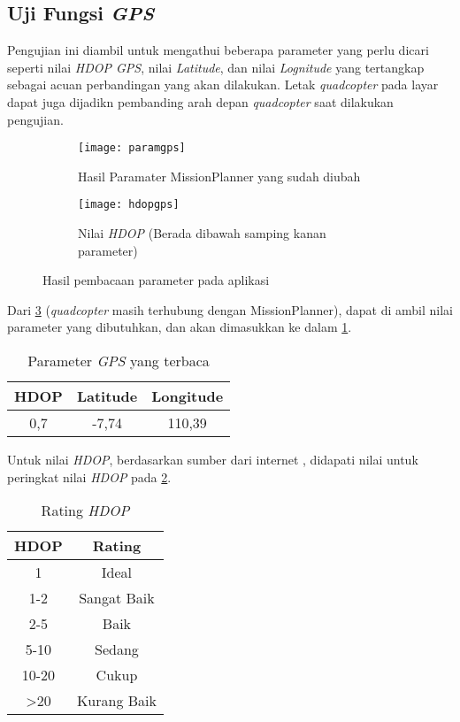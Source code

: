 \subsection{Uji Fungsi \textit{GPS}}
Pengujian ini diambil untuk mengathui beberapa parameter yang perlu dicari seperti nilai \textit{HDOP GPS}, nilai \textit{Latitude}, dan nilai \textit{Lognitude} yang tertangkap sebagai acuan perbandingan yang akan dilakukan. Letak \textit{quadcopter} pada layar dapat juga dijadikn pembanding arah depan \textit{quadcopter} saat dilakukan pengujian.

\begin{figure}[H]
	\centering
	\begin{subfigure}[b]{1\textwidth}
		\centering
		\texttt{[image: paramgps]}
		\caption{Hasil Paramater MissionPlanner yang sudah diubah}
		\label{fig:paramgps}
	\end{subfigure}
	\hfill
	\begin{subfigure}[b]{1\textwidth}
		\centering
		\texttt{[image: hdopgps]}
		\caption{Nilai \textit{HDOP} (Berada dibawah samping kanan parameter)}
		\label{fig:hdopgps}
	\end{subfigure}
	\caption{Hasil pembacaan parameter pada aplikasi}
	\label{fig:gpsonmissionplanner}
\end{figure}

Dari \cref{fig:gpsonmissionplanner} (\textit{quadcopter} masih terhubung dengan MissionPlanner), dapat di ambil nilai parameter yang dibutuhkan, dan akan dimasukkan ke dalam \cref{tab:gpsparam}.

\begin{table}[h]
	\caption{Parameter \textit{GPS} yang terbaca}
	\label{tab:gpsparam}
	\centering
	\begin{tabular}{|c|c|c|}
		\hline
		\textbf{HDOP} & \textbf{Latitude} & \textbf{Longitude} \\ \hline
		0,7  & -7,74    & 110,39    \\ \hline
	\end{tabular}
\end{table}

Untuk nilai \textit{HDOP}, berdasarkan sumber dari internet \citep{dop}, didapati nilai untuk peringkat nilai \textit{HDOP} pada \cref{tab:hdoprate}.

\begin{table}[H]
	\caption{Rating \textit{HDOP}}
	\label{tab:hdoprate}
	\centering
	\begin{tabular}{|c|c|}
		\hline
		\textbf{HDOP}             & \textbf{Rating}      \\ \hline
		1                & Ideal       \\ \hline
		1-2              & Sangat Baik \\ \hline
		2-5              & Baik        \\ \hline
		5-10             & Sedang      \\ \hline
		10-20            & Cukup       \\ \hline
		\textgreater{}20 & Kurang Baik \\ \hline
	\end{tabular}
\end{table}


